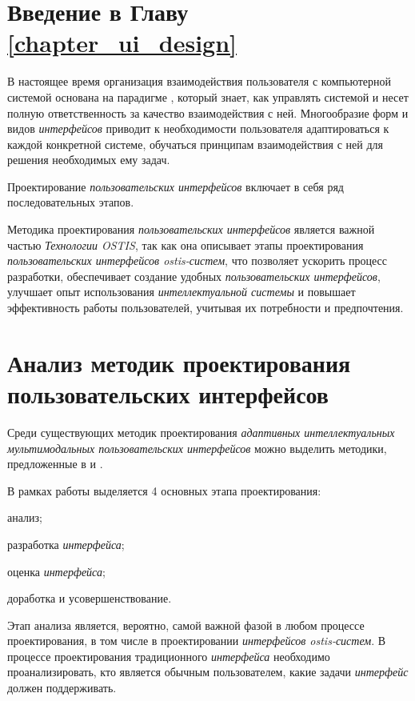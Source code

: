 \section*{Введение в Главу \ref{chapter_ui_design}}

В настоящее время организация взаимодействия пользователя с компьютерной системой основана на парадигме , который знает, как управлять системой и несет полную ответственность за качество взаимодействия с ней.
Многообразие форм и видов \textit{интерфейсов} приводит к необходимости пользователя  адаптироваться к каждой конкретной системе, обучаться принципам взаимодействия с ней для решения необходимых ему задач.

Проектирование \textit{пользовательских интерфейсов} включает в себя ряд последовательных этапов.

Методика проектирования \textit{пользовательских интерфейсов} является важной частью \textit{Технологии OSTIS}, так как она описывает этапы проектирования \textit{пользовательских интерфейсов ostis-систем}, что позволяет ускорить процесс разработки, обеспечивает создание удобных \textit{пользовательских интерфейсов}, улучшает опыт использования \textit{интеллектуальной системы} и повышает эффективность работы пользователей, учитывая их потребности и предпочтения.

\section{Анализ методик проектирования пользовательских интерфейсов}
\label{sec_analysis_UI_design_methodologies}

Среди существующих методик проектирования \textit{адаптивных интеллектуальных мультимодальных пользовательских интерфейсов} можно выделить методики, предложенные в  и  .

В рамках работы  выделяется 4 основных этапа проектирования:
\begin{textitemize}
    \item анализ;
    \item разработка \textit{интерфейса};
    \item оценка \textit{интерфейса};
    \item доработка и усовершенствование.
\end{textitemize}

Этап анализа является, вероятно, самой важной фазой в любом процессе проектирования, в том числе в проектировании \textit{интерфейсов ostis-систем}. В процессе проектирования традиционного \textit{интерфейса} необходимо проанализировать, кто является обычным пользователем, какие задачи \textit{интерфейс} должен поддерживать. 

